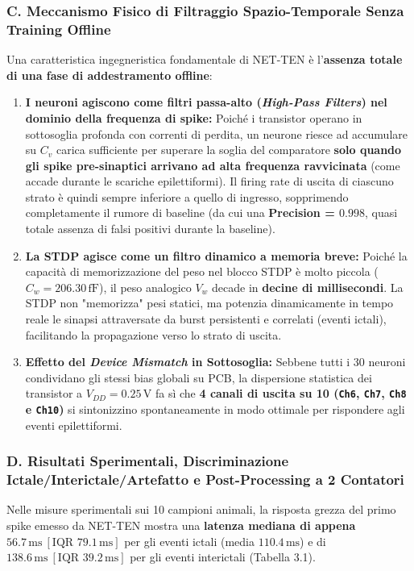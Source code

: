\documentclass[11pt,a4paper]{article}
\begin{document}
\subsubsection{C. Meccanismo Fisico di Filtraggio Spazio-Temporale Senza Training Offline}
Una caratteristica ingegneristica fondamentale di NET-TEN è l'\textbf{assenza totale di una fase di addestramento offline}:
\begin{enumerate}
  \item \textbf{I neuroni agiscono come filtri passa-alto (\textit{High-Pass Filters}) nel dominio della frequenza di spike:} Poiché i transistor operano in sottosoglia profonda con correnti di perdita, un neurone riesce ad accumulare su $C_v$ carica sufficiente per superare la soglia del comparatore \textbf{solo quando gli spike pre-sinaptici arrivano ad alta frequenza ravvicinata} (come accade durante le scariche epilettiformi). Il firing rate di uscita di ciascuno strato è quindi sempre inferiore a quello di ingresso, sopprimendo completamente il rumore di baseline (da cui una \textbf{Precision = $0.998$}, quasi totale assenza di falsi positivi durante la baseline).
  \item \textbf{La STDP agisce come un filtro dinamico a memoria breve:} Poiché la capacità di memorizzazione del peso nel blocco STDP è molto piccola (\textbf{$C_w = 206.30\,\text{fF}$}), il peso analogico $V_w$ decade in \textbf{decine di millisecondi}. La STDP non "memorizza" pesi statici, ma potenzia dinamicamente in tempo reale le sinapsi attraversate da burst persistenti e correlati (eventi ictali), facilitando la propagazione verso lo strato di uscita.
  \item \textbf{Effetto del \textit{Device Mismatch} in Sottosoglia:} Sebbene tutti i 30 neuroni condividano gli stessi bias globali su PCB, la dispersione statistica dei transistor a $V_{DD} = 0.25\,\text{V}$ fa sì che \textbf{4 canali di uscita su 10 (\texttt{Ch6}, \texttt{Ch7}, \texttt{Ch8} e \texttt{Ch10})} si sintonizzino spontaneamente in modo ottimale per rispondere agli eventi epilettiformi.
\end{enumerate}

\subsubsection{D. Risultati Sperimentali, Discriminazione Ictale/Interictale/Artefatto e Post-Processing a 2 Contatori}
Nelle misure sperimentali sui 10 campioni animali, la risposta grezza del primo spike emesso da NET-TEN mostra una \textbf{latenza mediana di appena $56.7\,\text{ms}\ [\text{IQR } 79.1\,\text{ms}]$} per gli eventi ictali (media $110.4\,\text{ms}$) e di \textbf{$138.6\,\text{ms}\ [\text{IQR } 39.2\,\text{ms}]$} per gli eventi interictali (Tabella 3.1).
\end{document}

